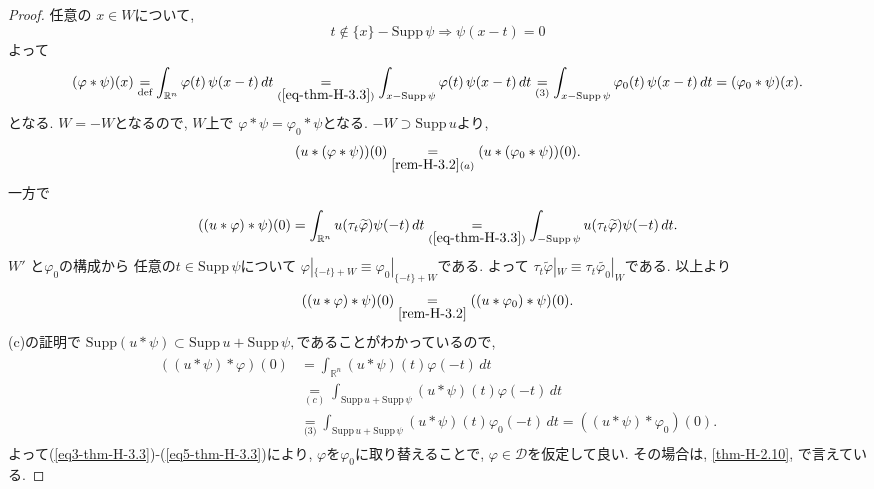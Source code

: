 \begin{proof}
任意の \(x \in W\)について, 
\begin{equation}
\label{eq-thm-H-3.3}
t \notin \{x\} - \mathrm{Supp}\, \psi
\Rightarrow
\psi(x - t) = 0
 \end{equation}
 よって
\[
 (\varphi \ast \psi)(x)
\underset{\text{def}}{=} \int_{\mathbb{R}^n} \varphi(t)\, \psi(x - t)\, dt
\underset{(\ref{eq-thm-H-3.3})}{=} \int_{x - \mathrm{Supp}\, \psi} \varphi(t)\, \psi(x - t)\, dt
\underset{\text{(3)}}{=}  \int_{x - \mathrm{Supp}\, \psi} \varphi_0(t)\, \psi(x - t)\, dt
\underset{}{=} (\varphi_0 \ast \psi)(x).
\]
となる. 
\( W = -W \)となるので, $W$上で \( \varphi \ast \psi = \varphi_0 \ast \psi \)となる. 
\(-W \supset \mathrm{Supp}\, u\)より, 
\begin{equation}
\label{eq3-thm-H-3.3}
(u \ast (\varphi \ast \psi))(0) 
\underset{\ref{rem-H-3.2}(a)}{=} 
(u \ast (\varphi_0 \ast \psi))(0).
\end{equation}
一方で
\[
((u \ast \varphi) \ast \psi)(0)
\underset{}{=}
 \int_{\mathbb{R}^n} u(\tau_t \widetilde{\varphi}) \psi(-t) \, dt
\underset{(\ref{eq-thm-H-3.3})}{=}
  \int_{-\mathrm{Supp}\, \psi} 
 u(\tau_t \widetilde{\varphi}) \psi(-t) \, dt.
\]
\(W'\) と\(\varphi_0\)の構成から
任意の\( t \in \mathrm{Supp}\, \psi\)について
\(\varphi|_{\{ -t\} + W} \equiv \varphi_0|_{ \{ -t\} + W}\)である. 
よって
$\tau_t \widetilde{\varphi}|_W \equiv \tau_t \widetilde{\varphi_0}|_W$である.
以上より
\begin{equation}
\label{eq4-thm-H-3.3}
 ((u \ast \varphi) \ast \psi)(0) 
 \underset{\ref{rem-H-3.2}}{=} 
  ((u \ast \varphi_0) \ast \psi)(0).
\end{equation}
(c)の証明で \(\mathrm{Supp}(u \ast \psi) \subset \mathrm{Supp}\, u + \mathrm{Supp}\, \psi,\)であることがわかっているので,
\begin{align}
\begin{split}
\label{eq5-thm-H-3.3}
((u \ast \psi) \ast \varphi)(0)
&= \int_{\mathbb{R}^n} (u \ast \psi)(t) \varphi(-t) \, dt \\
&\underset{(c)}{=} \int_{\mathrm{Supp}\, u + \mathrm{Supp}\, \psi} (u \ast \psi)(t) \varphi(-t) \, dt \\
&\underset{\text{(3)}}{=}  \int_{\mathrm{Supp}\, u + \mathrm{Supp}\, \psi} (u \ast \psi)(t) \varphi_0(-t) \, dt
= ((u \ast \psi) \ast \varphi_0)(0).
\end{split}
\end{align}
よって(\ref{eq3-thm-H-3.3})-(\ref{eq5-thm-H-3.3})により, $\varphi$を$\varphi_0$に取り替えることで,  $\varphi \in \mathcal{D}$を仮定して良い.
その場合は, \ref{thm-H-2.10}, \cite[Theorem 6.30 (c)]{Rud}で言えている. 
\end{proof}

